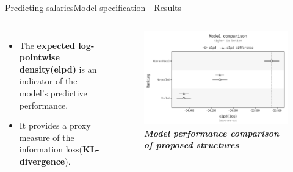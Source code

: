 \documentclass[aspectratio=169, xcolor=dvipsnames]{beamer}
\begin{document}
\begin{frame}{Predicting salaries}{Model specification - Results}
    \vspace*{-20pt}
    \begin{columns}
            \begin{itemize}
                \item \fontsize{10pt}{12pt}\selectfont The \textbf{expected log-pointwise density(elpd)} is an indicator of the model's predictive performance.
                \item \fontsize{10pt}{12pt}\selectfont It provides a proxy measure of the information loss(\textbf{KL-divergence}).
            \end{itemize}
            \begin{figure}
                \centering
                \includegraphics[width=1.0\textwidth]{./images/model_structure_comparison.png}
                \captionsetup{labelformat=empty}
                \setlength{\abovecaptionskip}{-10pt}
                \caption{\fontsize{8pt}{8pt}\selectfont \textbf{\textit{Model performance comparison of proposed structures}}}
            \end{figure}
    \end{columns}
\end{frame}
\end{document}
